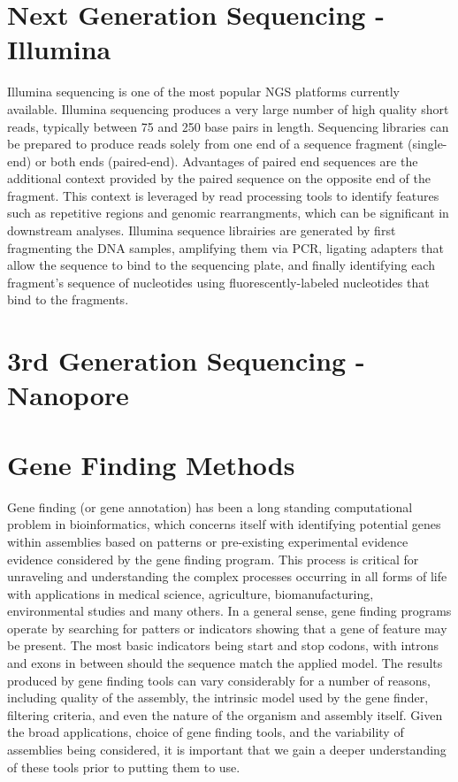 \section{Next Generation Sequencing - Illumina}
Illumina sequencing is one of the most popular NGS platforms currently
available. Illumina sequencing produces a very large number of high
quality short reads, typically between 75 and 250 base pairs in
length. Sequencing libraries can be prepared to produce reads solely
from one end of a sequence fragment (single-end) or both ends
(paired-end). Advantages of paired end sequences are the additional
context provided by the paired sequence on the opposite end of the
fragment. This context is leveraged by read processing tools to
identify features such as repetitive regions and genomic
rearrangments, which can be significant in downstream
analyses. Illumina sequence librairies are generated by first
fragmenting the DNA samples, amplifying them via PCR, ligating
adapters that allow the sequence to bind to the sequencing plate, and
finally identifying each fragment's sequence of nucleotides using
fluorescently-labeled nucleotides that bind to the fragments.

\section{3rd Generation Sequencing - Nanopore}

\section{Gene Finding Methods}
Gene finding (or gene annotation) has been a long standing
computational problem in bioinformatics, which concerns itself with
identifying potential genes within assemblies based on patterns or
pre-existing experimental evidence evidence considered by the gene
finding program. This process is critical for unraveling and
understanding the complex processes occurring in all forms of life
with applications in medical science, agriculture, biomanufacturing,
environmental studies and many others. In a general sense, gene
finding programs operate by searching for patters or indicators
showing that a gene of feature may be present. The most basic
indicators being start and stop codons, with introns and exons in
between should the sequence match the applied model. The results
produced by gene finding tools can vary considerably for a number of
reasons, including quality of the assembly, the intrinsic model used
by the gene finder, filtering criteria, and even the nature of the
organism and assembly itself. Given the broad applications, choice of
gene finding tools, and the variability of assemblies being
considered, it is important that we gain a deeper understanding of
these tools prior to putting them to use.

